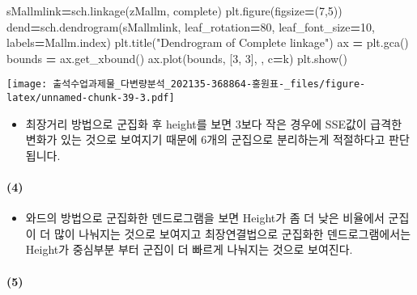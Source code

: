 \documentclass[
]{article}
\newenvironment{Shaded}{\begin{snugshade}}{\end{snugshade}}
\newcommand{\DecValTok}[1]{\textcolor[rgb]{0.00,0.00,0.81}{#1}}
\newcommand{\NormalTok}[1]{#1}
\newcommand{\OperatorTok}[1]{\textcolor[rgb]{0.81,0.36,0.00}{\textbf{#1}}}
\newcommand{\StringTok}[1]{\textcolor[rgb]{0.31,0.60,0.02}{#1}}
\providecommand{\tightlist}{%
  \setlength{\itemsep}{0pt}\setlength{\parskip}{0pt}}
\begin{document}
\begin{Shaded}
\begin{Highlighting}[]
\NormalTok{sMallmlink}\OperatorTok{=}\NormalTok{sch.linkage(zMallm, }\StringTok{\textquotesingle{}complete\textquotesingle{}}\NormalTok{)}
\NormalTok{plt.figure(figsize}\OperatorTok{=}\NormalTok{(}\DecValTok{7}\NormalTok{,}\DecValTok{5}\NormalTok{))}
\NormalTok{dend}\OperatorTok{=}\NormalTok{sch.dendrogram(sMallmlink, leaf\_rotation}\OperatorTok{=}\DecValTok{80}\NormalTok{, leaf\_font\_size}\OperatorTok{=}\DecValTok{10}\NormalTok{, labels}\OperatorTok{=}\NormalTok{Mallm.index)}
\NormalTok{plt.title(}\StringTok{"Dendrogram of Complete linkage"}\NormalTok{)}
\NormalTok{ax }\OperatorTok{=}\NormalTok{ plt.gca() }
\NormalTok{bounds }\OperatorTok{=}\NormalTok{ ax.get\_xbound() }
\NormalTok{ax.plot(bounds, [}\DecValTok{3}\NormalTok{, }\DecValTok{3}\NormalTok{], }\StringTok{\textquotesingle{}{-}{-}\textquotesingle{}}\NormalTok{, c}\OperatorTok{=}\StringTok{\textquotesingle{}k\textquotesingle{}}\NormalTok{)}
\NormalTok{plt.show() }
\end{Highlighting}
\end{Shaded}

\texttt{[image: 출석수업과제물\_다변량분석\_202135-368864-홍원표-\_files/figure-latex/unnamed-chunk-39-3.pdf]}

\begin{itemize}
\tightlist
\item
  최장거리 방법으로 군집화 후 height를 보면 3보다 작은 경우에 SSE값이
  급격한 변화가 있는 것으로 보여지기 때문에 6개의 군집으로 분리하는게
  적절하다고 판단됩니다.
\end{itemize}

\hypertarget{section-18}{%
\paragraph{(4)}\label{section-18}}

\begin{itemize}
\tightlist
\item
  와드의 방법으로 군집화한 덴드로그램을 보면 Height가 좀 더 낮은
  비율에서 군집이 더 많이 나눠지는 것으로 보여지고 최장연결법으로
  군집화한 덴드로그램에서는 Height가 중심부분 부터 군집이 더 빠르게
  나눠지는 것으로 보여진다.
\end{itemize}

\hypertarget{section-19}{%
\paragraph{(5)}\label{section-19}}
\end{document}
